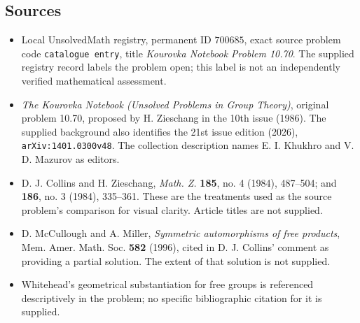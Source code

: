 \documentclass[11pt]{article}
\begin{document}
\subsection{Sources}
\begin{itemize}
\item Local UnsolvedMath registry, permanent ID \(700685\), exact source problem code \texttt{catalogue entry}, title \emph{Kourovka Notebook Problem 10.70}. The supplied registry record labels the problem open; this label is not an independently verified mathematical assessment.
\item \emph{The Kourovka Notebook (Unsolved Problems in Group Theory)}, original problem 10.70, proposed by H. Zieschang in the 10th issue (1986). The supplied background also identifies the 21st issue edition (2026), \texttt{arXiv:1401.0300v48}. The collection description names E. I. Khukhro and V. D. Mazurov as editors.
\item D. J. Collins and H. Zieschang, \emph{Math. Z.} \textbf{185}, no. 4 (1984), 487--504; and \textbf{186}, no. 3 (1984), 335--361. These are the treatments used as the source problem's comparison for visual clarity. Article titles are not supplied.
\item D. McCullough and A. Miller, \emph{Symmetric automorphisms of free products}, Mem. Amer. Math. Soc. \textbf{582} (1996), cited in D. J. Collins' comment as providing a partial solution. The extent of that solution is not supplied.
\item Whitehead's geometrical substantiation for free groups is referenced descriptively in the problem; no specific bibliographic citation for it is supplied.
\end{itemize}
\end{document}
